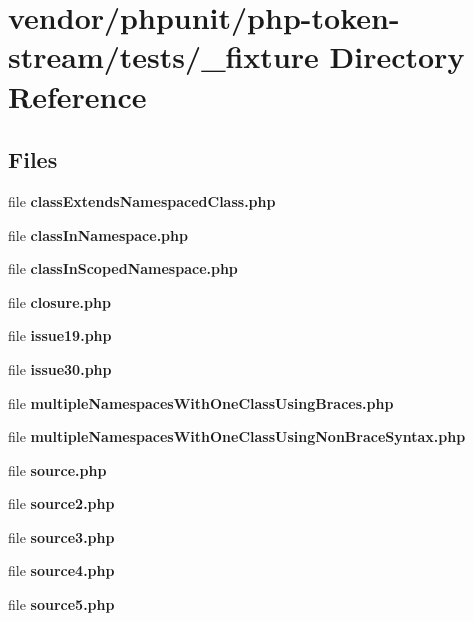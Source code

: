 \section{vendor/phpunit/php-\/token-\/stream/tests/\+\_\+fixture Directory Reference}
\label{dir_709393223fb5d7bb9f673c4b110145a3}
\subsection*{Files}
\begin{DoxyCompactItemize}
\item 
file {\bf class\+Extends\+Namespaced\+Class.\+php}
\item 
file {\bf class\+In\+Namespace.\+php}
\item 
file {\bf class\+In\+Scoped\+Namespace.\+php}
\item 
file {\bf closure.\+php}
\item 
file {\bf issue19.\+php}
\item 
file {\bf issue30.\+php}
\item 
file {\bf multiple\+Namespaces\+With\+One\+Class\+Using\+Braces.\+php}
\item 
file {\bf multiple\+Namespaces\+With\+One\+Class\+Using\+Non\+Brace\+Syntax.\+php}
\item 
file {\bf source.\+php}
\item 
file {\bf source2.\+php}
\item 
file {\bf source3.\+php}
\item 
file {\bf source4.\+php}
\item 
file {\bf source5.\+php}
\end{DoxyCompactItemize}
